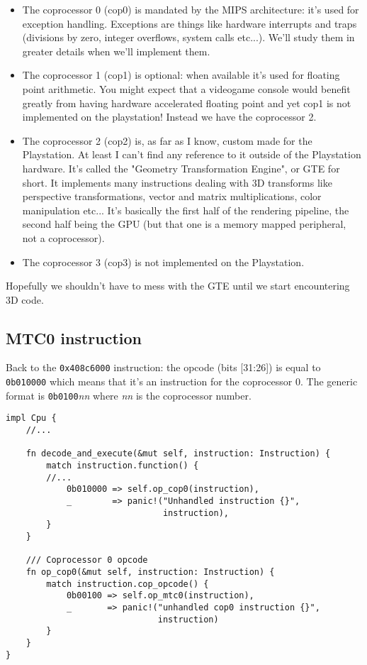 \documentclass[a4paper]{article}
\newcommand{\code}[1] {\texttt{#1}}
\begin{document}
\begin{itemize}
\item The coprocessor 0 (cop0) is mandated by the MIPS architecture:
  it's used for exception handling. Exceptions are things like
  hardware interrupts and traps (divisions by zero, integer overflows,
  system calls etc...). We'll study them in greater details when we'll
  implement them.

\item The coprocessor 1 (cop1) is optional: when available it's used for
  floating point arithmetic. You might expect that a videogame console
  would benefit greatly from having hardware accelerated floating point
  and yet cop1 is not implemented on the playstation! Instead we have
  the coprocessor 2.

\item The coprocessor 2 (cop2) is, as far as I know, custom made for
  the Playstation. At least I can't find any reference to it outside
  of the Playstation hardware. It's called the "Geometry
  Transformation Engine", or GTE for short. It implements many
  instructions dealing with 3D transforms like perspective
  transformations, vector and matrix multiplications, color
  manipulation etc... It's basically the first half of the rendering
  pipeline, the second half being the GPU (but that one is a memory
  mapped peripheral, not a coprocessor).

\item The coprocessor 3 (cop3) is not implemented on the Playstation.
\end{itemize}

Hopefully we shouldn't have to mess with the GTE until we start
encountering 3D code.

\subsection{MTC0 instruction}

Back to the \code{0x408c6000} instruction: the opcode (bits [31:26])
is equal to \code{0b010000} which means that it's an instruction for
the coprocessor 0. The generic format is \code{0b0100}\emph{nn} where
\emph{nn} is the coprocessor number.

\begin{lstlisting}
impl Cpu {
    //...

    fn decode_and_execute(&mut self, instruction: Instruction) {
        match instruction.function() {
	    //...
            0b010000 => self.op_cop0(instruction),
            _        => panic!("Unhandled instruction {}",
                               instruction),
        }
    }

    /// Coprocessor 0 opcode
    fn op_cop0(&mut self, instruction: Instruction) {
        match instruction.cop_opcode() {
            0b00100 => self.op_mtc0(instruction),
            _       => panic!("unhandled cop0 instruction {}",
                              instruction)
        }
    }
}
\end{lstlisting}
\end{document}
